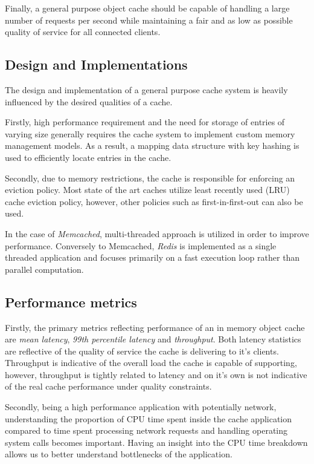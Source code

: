 Finally, a general purpose object cache should be capable of handling a large number of requests per second while maintaining a fair and as low as possible quality of service for all connected clients.


\subsection{Design and Implementations}
The design and implementation of a general purpose cache system is heavily influenced by the desired qualities of a cache.

Firstly, high performance requirement and the need for storage of entries of varying size generally requires the cache system to implement custom memory management models. As a result, a mapping data structure  with key hashing is used to efficiently locate entries in the cache.

Secondly, due to memory restrictions, the cache is responsible for enforcing an eviction policy. Most state of the art caches utilize least recently used (LRU) cache eviction policy, however, other policies such as first-in-first-out can also be used.

In the case of \textit{Memcached}, multi-threaded approach is utilized in order to improve performance. Conversely to Memcached, \textit{Redis} is implemented as a single threaded application and focuses primarily on a fast execution loop rather than parallel computation.


\subsection{Performance metrics}
Firstly, the primary metrics reflecting performance of an in memory object cache are \textit{mean latency}, \textit{99th percentile latency} and \textit{throughput}. Both latency statistics are reflective of the quality of service the cache is delivering to it's clients. Throughput is indicative of the overall load the cache is capable of supporting, however, throughput is tightly related to latency and on it's own is not indicative of the real cache performance under quality constraints.

Secondly, being a high performance application with potentially network, understanding the proportion of CPU time spent inside the cache application compared to time spent processing network requests and handling operating system calls becomes important. Having an insight into the CPU time breakdown allows us to better understand bottlenecks of the application.


